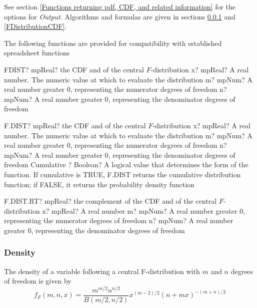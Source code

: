 \vspace{0.3cm}
See section \ref{Functions returning pdf, CDF, and related information} for the options for {\itshape\sffamily Output}. Algorithms and formulas are given in sections \ref{FDistributionDensity} and \ref{FDistributionCDF}.


\vspace{0.3cm}

The following functions are provided for compatibility with established spreadsheet functions

\vspace{0.3cm}
\begin{mpFunctionsExtract}
	\mpWorksheetFunctionThreeNotImplemented
	{FDIST? mpReal? the CDF and of the central $F$-distribution}
	{x? mpReal? A real number. The numeric value at which to evaluate the distribution}
	{m? mpNum? A real number greater 0, representing the numerator  degrees of freedom}
	{n? mpNum? A real number greater 0, representing the denominator degrees of freedom}
\end{mpFunctionsExtract}

\vspace{0.6cm}
\begin{mpFunctionsExtract}
	\mpWorksheetFunctionFourNotImplemented
	{F.DIST? mpReal? the CDF and of the central $F$-distribution}
	{x? mpReal? A real number. The numeric value at which to evaluate the distribution}
	{m? mpNum? A real number greater 0, representing the numerator  degrees of freedom}
	{n? mpNum? A real number greater 0, representing the denominator degrees of freedom}
	{Cumulative ? Boolean? A logical value that determines the form of the function. If cumulative is TRUE, F.DIST returns the cumulative distribution function; if FALSE, it returns the probability density function}
\end{mpFunctionsExtract}

\vspace{0.6cm}
\begin{mpFunctionsExtract}
	\mpWorksheetFunctionThreeNotImplemented
	{F.DIST.RT? mpReal? the complement of the CDF and of the central $F$-distribution}
	{x? mpReal? A real number}
	{m? mpNum? A real number greater 0, representing the numerator  degrees of freedom}
	{n? mpNum? A real number greater 0, representing the denominator degrees of freedom}
\end{mpFunctionsExtract}






\subsubsection{Density}
\label{FDistributionDensity}
The density of a variable following a central F-distribution with  $m$ and $n$  degrees of freedom is given by
\begin{equation}
	f_F(m,n,x) = \frac{m^{m/2} n^{n/2}}{B(m/2,n/2)} x^{(m-2)/2} (n+mx)^{-(m+n)/2}
\end{equation}

